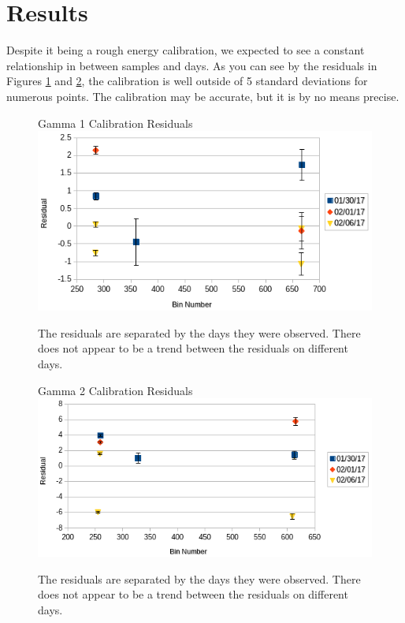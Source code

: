 \documentclass[10pt]{IEEEtran}
\begin{document}
\newpage
\section{Results}

Despite it being a rough energy calibration, we expected to see a constant relationship in between samples and days. As you can see by the residuals in Figures \ref{fig:calres1} and \ref{fig:calres2}, the calibration is well outside of 5 standard deviations for numerous points. The calibration may be accurate, but it is by no means precise.
    \begin{figure}[!hbt]
        \begin{center}
			\normalsize{Gamma 1 Calibration Residuals}
			\includegraphics[width=\linewidth]{Gamma1CalResidual}
			\caption{The residuals are separated by the days they were observed. There does not appear to be a trend between the residuals on different days.}
			\label{fig:calres1}	
         \end{center}
    \end{figure}
    
    \begin{figure}[!hbt]
        \begin{center}
			\normalsize{Gamma 2 Calibration Residuals}
			\includegraphics[width=\linewidth]{Gamma2CalResidual}
			\caption{The residuals are separated by the days they were observed. There does not appear to be a trend between the residuals on different days.}
			\label{fig:calres2}
         \end{center}
    \end{figure} 
\end{document}
